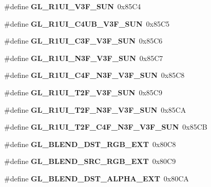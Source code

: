 \begin{DoxyCompactItemize}
\item 
\#define {\bfseries G\+L\+\_\+\+R1\+U\+I\+\_\+\+V3\+F\+\_\+\+S\+U\+N}~0x85\+C4\label{_s_d_l__opengl_8h_a66a6e6ad58351a3a94adac8ef7c3cc61}

\item 
\#define {\bfseries G\+L\+\_\+\+R1\+U\+I\+\_\+\+C4\+U\+B\+\_\+\+V3\+F\+\_\+\+S\+U\+N}~0x85\+C5\label{_s_d_l__opengl_8h_a263fbe91093608f1e41eef4a07070cad}

\item 
\#define {\bfseries G\+L\+\_\+\+R1\+U\+I\+\_\+\+C3\+F\+\_\+\+V3\+F\+\_\+\+S\+U\+N}~0x85\+C6\label{_s_d_l__opengl_8h_a10f0bd4a6c946eafff21d39f095fae84}

\item 
\#define {\bfseries G\+L\+\_\+\+R1\+U\+I\+\_\+\+N3\+F\+\_\+\+V3\+F\+\_\+\+S\+U\+N}~0x85\+C7\label{_s_d_l__opengl_8h_ad1f88853e5a89661d5852be2da6e4fb7}

\item 
\#define {\bfseries G\+L\+\_\+\+R1\+U\+I\+\_\+\+C4\+F\+\_\+\+N3\+F\+\_\+\+V3\+F\+\_\+\+S\+U\+N}~0x85\+C8\label{_s_d_l__opengl_8h_a12fd57a92127439db08883b93cff28a1}

\item 
\#define {\bfseries G\+L\+\_\+\+R1\+U\+I\+\_\+\+T2\+F\+\_\+\+V3\+F\+\_\+\+S\+U\+N}~0x85\+C9\label{_s_d_l__opengl_8h_aae72bd86a941cb43f97bb98a01e47c36}

\item 
\#define {\bfseries G\+L\+\_\+\+R1\+U\+I\+\_\+\+T2\+F\+\_\+\+N3\+F\+\_\+\+V3\+F\+\_\+\+S\+U\+N}~0x85\+C\+A\label{_s_d_l__opengl_8h_a9d45279d96f56dad3c6676b9946c8b61}

\item 
\#define {\bfseries G\+L\+\_\+\+R1\+U\+I\+\_\+\+T2\+F\+\_\+\+C4\+F\+\_\+\+N3\+F\+\_\+\+V3\+F\+\_\+\+S\+U\+N}~0x85\+C\+B\label{_s_d_l__opengl_8h_aa832e68aab8fd80210b493c7f1e22b5a}

\item 
\#define {\bfseries G\+L\+\_\+\+B\+L\+E\+N\+D\+\_\+\+D\+S\+T\+\_\+\+R\+G\+B\+\_\+\+E\+X\+T}~0x80\+C8\label{_s_d_l__opengl_8h_a6b724151316c69675e0bbc924d0f19a9}

\item 
\#define {\bfseries G\+L\+\_\+\+B\+L\+E\+N\+D\+\_\+\+S\+R\+C\+\_\+\+R\+G\+B\+\_\+\+E\+X\+T}~0x80\+C9\label{_s_d_l__opengl_8h_a8757ee79809302512de0348aa80fbb43}

\item 
\#define {\bfseries G\+L\+\_\+\+B\+L\+E\+N\+D\+\_\+\+D\+S\+T\+\_\+\+A\+L\+P\+H\+A\+\_\+\+E\+X\+T}~0x80\+C\+A\label{_s_d_l__opengl_8h_a649e5e1cfad83a4c4e8c62e21d3be4c6}


\end{DoxyCompactItemize}

